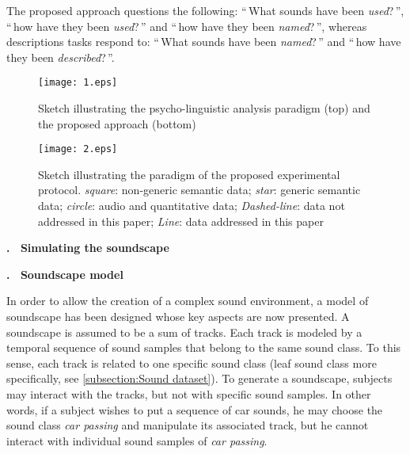 \documentclass[12pt, titlepage, reqno]{article} %
\renewcommand{\section}[1]{\medskip \addtocounter{section}{1}\raggedright 
     \textbf{\Roman{section}. \ #1}\medskip \setcounter{subsection}{0}
    \setlength{\parindent}{5ex}
 }
\renewcommand{\subsection}[1]{\medskip \addtocounter{subsection}{1}\raggedright
    \textbf{\Alph{subsection}. \ #1} \medskip \setcounter{subsubsection}{0}\setlength{\parindent}{5ex}
}
\begin{document}
The proposed approach questions the following: ``\,What sounds have been \emph{used}?\,'', ``\,how have they been \emph{used}?\,'' and  ``\,how have they been \emph{named}?\,'', whereas descriptions  tasks respond to:  ``\,What sounds have been \emph{named}?\,'' and ``\,how have they been \emph{described}?\,''.

\begin{figure}[t]
\begin{center}
\texttt{[image: 1.eps]}
  \caption{\label{psycholing} Sketch illustrating the psycho-linguistic analysis paradigm (top) and the proposed approach (bottom)}
  \end{center}
\end{figure}


 \begin{figure*}[t]
\begin{center}
\texttt{[image: 2.eps]}
  \caption{\label{Paradigm} Sketch illustrating the paradigm of the proposed experimental protocol. \textit{square}: non-generic semantic data; \textit{star}: generic semantic data; \textit{circle}: audio and quantitative data; \textit{Dashed-line}: data not addressed in this paper; \textit{Line}: data addressed in this paper}
  \end{center}
\end{figure*}

\section{Simulating the soundscape}

\subsection{Soundscape model}


In order to allow the creation of a complex sound environment, a model of soundscape has been designed whose key aspects are now presented. A soundscape is assumed to be a sum of tracks. Each track is modeled by a temporal sequence of sound samples that belong to the same sound class. To this sense, each track is related to one specific sound class (leaf sound class more specifically, see \ref{subsection:Sound dataset}). To generate a soundscape, subjects may interact with the tracks, but not with specific sound samples. In other words, if a subject wishes to put a sequence of car sounds, he may choose the sound class \textit{car passing} and manipulate its associated track, but he cannot interact with individual sound samples of \textit{car passing}.
\end{document}
